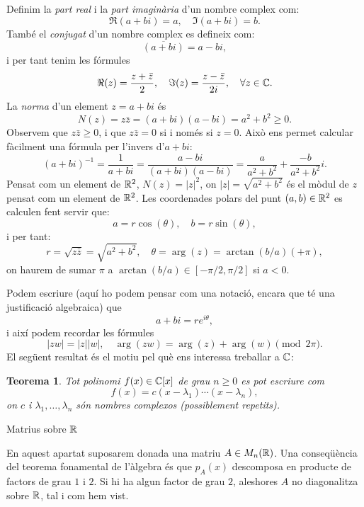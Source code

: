 \documentclass[
  11pt,
]{book}
\makeatletter
\numberwithin{dummy}{section}
\theoremstyle{maincolornumbox}
\newtheorem{theorem}{TTTT}[chapter]
\newtheorem{theoremeT}{Teorema}[chapter]
\theoremstyle{blacknumex}
\theoremstyle{blacknumbox}
\theoremstyle{maincolornum}
\renewenvironment{theorem}{\begin{tBox}\begin{theoremeT}}{\end{theoremeT}\end{tBox}}
\renewcommand{\section}{\@startsection{section}{1}{\z@}
{-4ex \@plus -1ex \@minus -.4ex}
{1ex \@plus.2ex }
{\normalfont\large\sffamily\bfseries}}
\makeatother
\begin{document}
Definim la \emph{part real} i la \emph{part imaginària} d'un nombre complex com:
\[\Re(a+bi) = a,\quad \Im(a+bi) = b.\] També el \emph{conjugat} d'un nombre
complex es defineix com: \[\overline{(a+bi)} = a-bi,\] i per tant tenim
les fórmules
\[\Re(z) = \frac{z+\bar z}{2},\quad \Im(z)=\frac{z-\bar z}{2i},\quad \forall z\in\mathbb{C}.\]
La \emph{norma} d'un element \(z=a+bi\) és
\[N(z) = z\bar z = (a+bi)(a-bi) = a^2+b^2\geq 0.\] Observem que
\(z\bar z \geq 0\), i que \(z\bar z = 0\) si i només si \(z=0\). Això ens
permet calcular fàcilment una fórmula per l'invers d'\(a+bi\):
\[(a+bi)^{-1} = \frac{1}{a+bi} = \frac{a-bi}{(a+bi)(a-bi)} = \frac{a}{a^2+b^2}+\frac{-b}{a^2+b^2}i.\]
Pensat com un element de \(\mathbb{R}^2\), \(N(z)=|z|^2\), on \(|z|=\sqrt{a^2+b^2}\)
és el mòdul de \(z\) pensat com un element de \(\mathbb{R}^2\). Les coordenades
polars del punt \((a,b)\in\mathbb{R}^2\) es calculen fent servir que:
\[a = r\cos(\theta),\quad b = r\sin(\theta),\] i per tant:
\[r = \sqrt{z\bar z}=\sqrt{a^2+b^2},\quad \theta = \arg(z) = \arctan(b/a) (+\pi),\]
on haurem de sumar \(\pi\) a \(\arctan(b/a)\in[-\pi/2,\pi/2]\) si \(a<0\).

Podem escriure (aquí ho podem pensar com una notació, encara que té una
justificació algebraica) que \[a+bi = re^{i\theta},\] i així podem
recordar les fórmules
\[|zw|=|z||w|,\quad \arg(zw)=\arg(z)+\arg(w)\pmod{2\pi}.\] El següent
resultat és el motiu pel què ens interessa treballar a \(\mathbb{C}\):

\begin{theorem}
Tot polinomi \(f(x)\in \mathbb{C}[x]\) de grau \(n\geq 0\) es pot escriure com
\[f(x) = c (x-\lambda_1)\cdots (x-\lambda_n),\] on \(c\) i
\(\lambda_1,\ldots,\lambda_n\) són nombres complexos (possiblement
repetits).
\end{theorem}

\section{\texorpdfstring{Matrius sobre \(\mathbb{R}\)}{Matrius sobre \textbackslash R}}\label{matrius-sobre-r}

En aquest apartat suposarem donada una matriu \(A\in M_n(\mathbb{R})\). Una
conseqüència del teorema fonamental de l'àlgebra és que \(p_A(x)\)
descomposa en producte de factors de grau \(1\) i \(2\). Si hi ha algun
factor de grau \(2\), aleshores \(A\) no diagonalitza sobre \(\mathbb{R}\), tal i com
hem vist.
\end{document}

